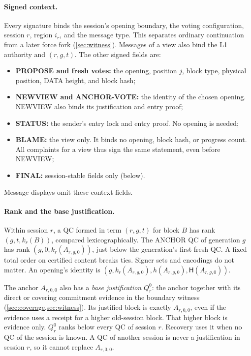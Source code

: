 \documentclass[11pt,a4paper]{article}
\newcommand{\Hash}{\mathsf H}
\begin{document}
\paragraph{Signed context.}
Every signature binds the session's opening boundary, the voting
configuration, session $r$, region $i_r$, and the message type. This
separates ordinary continuation from a later force fork
(\cref{sec:witness}). Messages of a view also bind the L1
authority and $(r,g,t)$. The other signed fields are:
\begin{itemize}
\item \textbf{PROPOSE and fresh votes:} the opening, position $j$, block
type, physical position, DATA height, and block hash;
\item \textbf{NEWVIEW and ANCHOR-VOTE:} the identity of the chosen
opening. NEWVIEW also binds its justification and entry proof;
\item \textbf{STATUS:} the sender's entry lock and entry proof. No
opening is needed;
\item \textbf{BLAME:} the view only. It binds no opening, block hash, or
progress count. All complaints for a view thus sign the same statement,
even before NEWVIEW;
\item \textbf{FINAL:} session-stable fields only (below).
\end{itemize}
Message displays omit these context fields.

\paragraph{Rank and the base justification.}
Within session $r$, a QC formed in term $(r,g,t)$ for block $B$ has rank
$(g,t,k_r(B))$, compared lexicographically. The ANCHOR QC of generation
$g$ has rank $(g,0,k_r(A_{r,g,0}))$, just below the generation's first
fresh QC. A fixed total order on certified content breaks ties. Signer
sets and encodings do not matter. An opening's identity is
$(g,k_r(A_{r,g,0}),h(A_{r,g,0}),\Hash(A_{r,g,0}))$.

The anchor $A_{r,0,0}$ also has a \emph{base justification} $Q_r^0$: the
anchor together with its direct or covering commitment evidence in the
boundary witness (\cref{sec:coverage,sec:witness}). Its justified block
is exactly $A_{r,0,0}$, even if the evidence uses a receipt for a higher
old-session block. That higher block is evidence only. $Q_r^0$ ranks
below every QC of session $r$.
Recovery uses it when no QC of the session is known. A QC of another
session is never a justification in session $r$, so it cannot replace
$A_{r,0,0}$.
\end{document}
